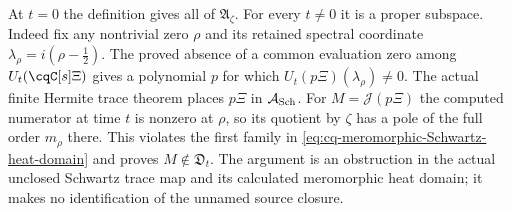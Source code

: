 At $t=0$ the definition gives all of $\mathfrak A_\zeta$.
For every $t\ne0$ it is a proper subspace. Indeed fix any
nontrivial zero $\rho$ and its retained spectral coordinate
$\lambda_\rho=i(\rho-\tfrac12)$. The proved absence of a
common evaluation zero among $U_t(\cqC[s]\Xi)$ gives a
polynomial $p$ for which
$U_t(p\Xi)(\lambda_\rho)\ne0$. The actual finite Hermite
trace theorem places $p\Xi$ in $\mathcal A_{\rm Sch}$.
For $M=\mathscr J(p\Xi)$ the computed numerator at time $t$
is nonzero at $\rho$, so its quotient by $\zeta$ has a pole
of the full order $m_\rho$ there. This violates the first
family in \eqref{eq:cq-meromorphic-Schwartz-heat-domain} and
proves $M\notin\mathfrak D_t$. The argument is an obstruction
in the actual unclosed Schwartz trace map and its calculated
meromorphic heat domain; it makes no identification of the
unnamed source closure.
